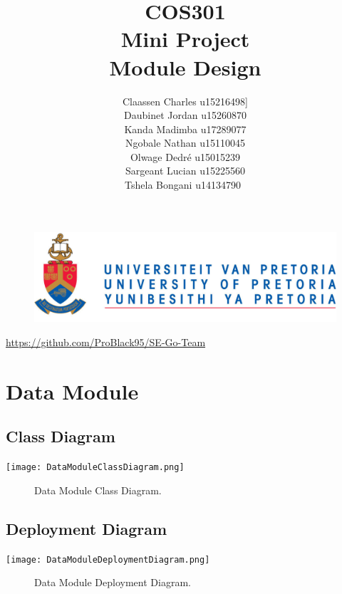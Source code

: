 \documentclass[12pt]{article}
\begin{document}
	

	\begin{figure}
		\includegraphics[width=\linewidth]{logo.jpg}	
	\end{figure}

	\title 	{
				COS301\\
				Mini Project\\
				Module Design
		}
	\author {
				Claassen Charles u15216498]\\
                Daubinet Jordan u15260870\\
                Kanda Madimba u17289077\\
                Ngobale Nathan u15110045\\
                Olwage Dedré u15015239\\
                Sargeant Lucian u15225560\\
                Tshela Bongani u14134790\
		}
	\maketitle
	\begin{center}
			\url{https://github.com/ProBlack95/SE-Go-Team}	
	\end{center}
	\newpage
	\tableofcontents
	
	\newpage
		
	\section{Data Module}
	
	\subsection{Class Diagram}
        \texttt{[image: DataModuleClassDiagram.png]}
        \begin{figure}[h]
            \caption{Data Module Class Diagram.}
        \end{figure}
    
    \subsection{Deployment Diagram}
        \texttt{[image: DataModuleDeploymentDiagram.png]}
        \begin{figure}[h]
            \caption{Data Module Deployment Diagram.}
        \end{figure}
        
\end{document}
